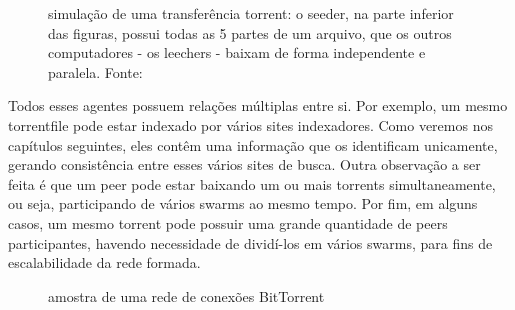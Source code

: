 \begin{figure}[H]
    \vspace{\myvsize}

    \begin{subfigure}[H]{\myhsize}
        \caption{}
        \label{fig:torrent-repr-9}
    \end{subfigure}

    \caption{simulação de uma transferência torrent: o seeder, na parte
    inferior das figuras, possui todas as 5 partes de um arquivo, que os outros
    computadores - os leechers - baixam de forma independente e paralela. Fonte:
    \cite{fig:torrent-dl}}
    \label{fig:torrent-repr}
\end{figure}

Todos esses agentes possuem relações múltiplas entre si. Por exemplo, um mesmo
\gls*{torrentfile} pode estar indexado por vários sites indexadores. Como veremos
nos capítulos seguintes, eles contêm uma informação que os identificam unicamente,
gerando consistência entre esses vários sites de busca. Outra observação a ser feita é
que um \gls*{peer} pode estar baixando um ou mais \glspl*{torrent} simultaneamente, ou
seja, participando de vários \glspl*{swarm} ao mesmo tempo. Por fim, em alguns casos,
um mesmo \gls*{torrent} pode possuir uma grande quantidade de \glspl*{peer}
participantes, havendo necessidade de dividí-los em vários \glspl*{swarm}, para fins de
escalabilidade da rede formada.

\begin{figure}[H]
    \centering
    \caption{amostra de uma rede de conexões BitTorrent}
    \label{fig:torrent-universo}
\end{figure}




